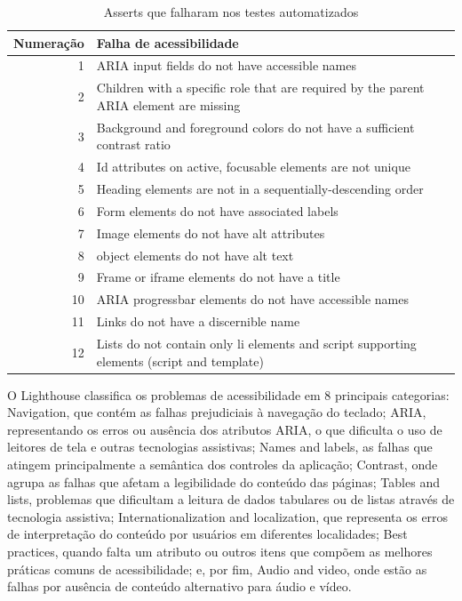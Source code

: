 \documentclass[
	12pt,				%
	openright,			%
	oneside,			%
	a4paper,			%
	chapter=TITLE,		%
	section=TITLE,		%
	subsection=TITLE,	%
	subsubsection=TITLE,%
	english,			%
	brazil				%
	]{abntex2}
\theoremstyle{definition}
\begin{document}
\begin{table}[h]
\centering
\caption{Asserts que falharam nos testes automatizados}
\begin{tabular}{r|lr}

Numera{\c c}{\~a}o & Falha de acessibilidade \\ %
\hline                               %
1 & ARIA input fields do not have accessible names       \\
2 & Children with a specific role that are required by the parent ARIA element are missing \\
3 & Background and foreground colors do not have a sufficient contrast ratio             \\
4 & Id attributes on active, focusable elements are not unique        \\
5 & Heading elements are not in a sequentially-descending order \\             
6 & Form elements do not have associated labels \\
7 & Image elements do not have alt attributes \\
8 & object elements do not have alt text \\
9 & Frame or iframe elements do not have a title \\
10 & ARIA progressbar elements do not have accessible names \\
11 & Links do not have a discernible name \\
12 & Lists do not contain only li elements and script supporting elements (script and template)

\end{tabular}
\end{table}



O Lighthouse classifica os problemas de acessibilidade em 8 principais categorias: Navigation, que contém as falhas prejudiciais à navegação do teclado; ARIA, representando os erros ou ausência dos atributos ARIA, o que dificulta o uso de leitores de tela e outras tecnologias assistivas; Names and labels, as falhas que atingem principalmente a semântica dos controles da aplicação; Contrast, onde agrupa as falhas que afetam a legibilidade do conteúdo das páginas; Tables and lists, problemas que dificultam a leitura de dados tabulares ou de listas através de tecnologia assistiva; Internationalization and localization, que representa os erros de interpretação do conteúdo por usuários em diferentes localidades; Best practices, quando falta um atributo ou outros itens que compõem as melhores práticas comuns de acessibilidade; e, por fim, Audio and video, onde estão as falhas por ausência de conteúdo alternativo para áudio e vídeo.
\end{document}
